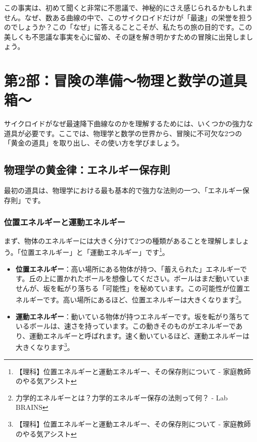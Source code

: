 \documentclass[a4paper,12pt]{bxjsarticle}
\begin{document}
この事実は、初めて聞くと非常に不思議で、神秘的にさえ感じられるかもしれません。なぜ、数ある曲線の中で、このサイクロイドだけが「最速」の栄誉を担うのでしょうか？この「なぜ」に答えることこそが、私たちの旅の目的です。この美しくも不思議な事実を心に留め、その謎を解き明かすための冒険に出発しましょう。

\section{第2部：冒険の準備〜物理と数学の道具箱〜}

サイクロイドがなぜ最速降下曲線なのかを理解するためには、いくつかの強力な道具が必要です。ここでは、物理学と数学の世界から、冒険に不可欠な2つの「黄金の道具」を取り出し、その使い方を学びましょう。

\subsection{物理学の黄金律：エネルギー保存則}

最初の道具は、物理学における最も基本的で強力な法則の一つ、「エネルギー保存則」です。

\subsubsection{位置エネルギーと運動エネルギー}

まず、物体のエネルギーには大きく分けて2つの種類があることを理解しましょう。「位置エネルギー」と「運動エネルギー」です\footnote{【理科】位置エネルギーと運動エネルギー、その保存則について - 家庭教師のやる気アシスト}。

\begin{itemize}
\item \textbf{位置エネルギー}：高い場所にある物体が持つ、「蓄えられた」エネルギーです。丘の上に置かれたボールを想像してください。ボールはまだ動いていませんが、坂を転がり落ちる「可能性」を秘めています。この可能性が位置エネルギーです。高い場所にあるほど、位置エネルギーは大きくなります\footnote{力学的エネルギーとは？力学的エネルギー保存の法則って何？ - Lab BRAINS}。

\item \textbf{運動エネルギー}：動いている物体が持つエネルギーです。坂を転がり落ちているボールは、速さを持っています。この動きそのものがエネルギーであり、運動エネルギーと呼ばれます。速く動いているほど、運動エネルギーは大きくなります\footnote{【理科】位置エネルギーと運動エネルギー、その保存則について - 家庭教師のやる気アシスト}。
\end{itemize}
\end{document}
